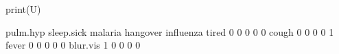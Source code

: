 \begin{Schunk}
% --begin: "comp.u"
\begin{Sinput}
 print(U)
\end{Sinput}
\begin{Soutput}
         pulm.hyp sleep.sick malaria hangover influenza
tired           0          0       0        0         0
cough           0          0       0        0         1
fever           0          0       0        0         0
blur.vis        1          0       0        0         0
\end{Soutput}
%
% --end: "comp.u"
\end{Schunk}
